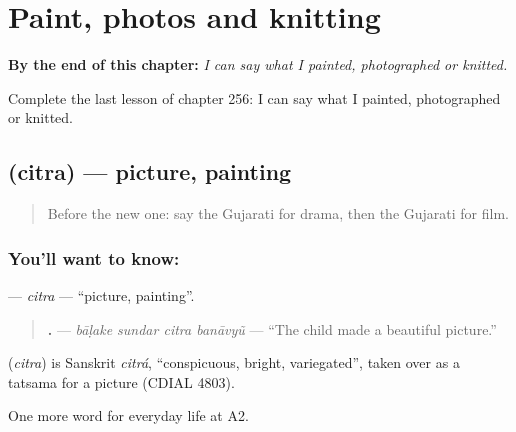 
\chapter{Paint, photos and knitting}
\label{ch:gu-paint-photos-and-knitting}

\begin{chapteropening}
\textbf{By the end of this chapter:} \emph{I can say what I painted, photographed or knitted.}

Complete the last lesson of chapter 256: I can say what I painted, photographed or knitted.
\end{chapteropening}

\section[\texorpdfstring{\gu{ચિત્ર} (citra)}{ચિત્ર (citra)}]{ (citra) — picture, painting}

\label{lesson:GU-C256-citra}



\begin{quote}
Before the new one: say the Gujarati for drama, then the Gujarati for film.
\end{quote}

\subsection*{You'll want to know: }
\textbf{} — \emph{citra} — \textquotedblleft{}picture, painting\textquotedblright{}.

\begin{quote}
\textbf{   .} — \emph{bāḷake sundar citra banāvyũ} — \textquotedblleft{}The child made a beautiful picture.\textquotedblright{}
\end{quote}

\begin{cousinweb}
\textbf{} (\emph{citra}) is Sanskrit \emph{citrá}, \textquotedblleft{}conspicuous, bright, variegated\textquotedblright{}, taken over as a tatsama for a picture (CDIAL 4803).
\end{cousinweb}

\begin{grammarlens}[title={What you've built}]
One more word for everyday life at A2.
\end{grammarlens}


